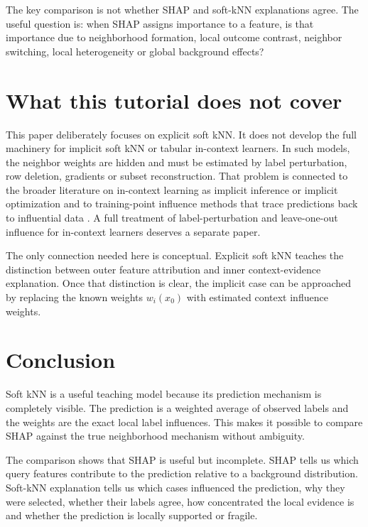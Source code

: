 \documentclass[11pt]{article}
\newcommand{\1}{\mathbf{1}}
\begin{document}
The key comparison is not whether SHAP and soft-kNN explanations agree. The useful question is: when SHAP assigns importance to a feature, is that importance due to neighborhood formation, local outcome contrast, neighbor switching, local heterogeneity or global background effects?

\section{What this tutorial does not cover}

This paper deliberately focuses on explicit soft kNN. It does not develop the full machinery for implicit soft kNN or tabular in-context learners. In such models, the neighbor weights are hidden and must be estimated by label perturbation, row deletion, gradients or subset reconstruction. That problem is connected to the broader literature on in-context learning as implicit inference or implicit optimization \citep{xie2022explanation,vonOswald2023transformers} and to training-point influence methods that trace predictions back to influential data \citep{koh2017understanding}. A full treatment of label-perturbation and leave-one-out influence for in-context learners deserves a separate paper.

The only connection needed here is conceptual. Explicit soft kNN teaches the distinction between outer feature attribution and inner context-evidence explanation. Once that distinction is clear, the implicit case can be approached by replacing the known weights $w_i(x_0)$ with estimated context influence weights.

\section{Conclusion}

Soft kNN is a useful teaching model because its prediction mechanism is completely visible. The prediction is a weighted average of observed labels and the weights are the exact local label influences. This makes it possible to compare SHAP against the true neighborhood mechanism without ambiguity.

The comparison shows that SHAP is useful but incomplete. SHAP tells us which query features contribute to the prediction relative to a background distribution. Soft-kNN explanation tells us which cases influenced the prediction, why they were selected, whether their labels agree, how concentrated the local evidence is and whether the prediction is locally supported or fragile.
\end{document}
